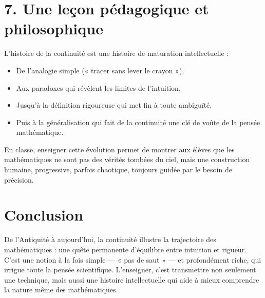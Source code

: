 \documentclass[12pt, a4paper]{article}
\begin{document}
\section*{7. Une leçon pédagogique et philosophique}
L’histoire de la continuité est une histoire de maturation intellectuelle :
\begin{itemize}
    \item De l’analogie simple (« tracer sans lever le crayon »),
    \item Aux paradoxes qui révèlent les limites de l’intuition,
    \item Jusqu’à la définition rigoureuse qui met fin à toute ambiguïté,
    \item Puis à la généralisation qui fait de la continuité une clé de voûte de la pensée mathématique.
\end{itemize}
En classe, enseigner cette évolution permet de montrer aux élèves que les mathématiques ne sont pas des vérités tombées du ciel, mais une construction humaine, progressive, parfois chaotique, toujours guidée par le besoin de précision.

\section*{Conclusion}
De l’Antiquité à aujourd’hui, la continuité illustre la trajectoire des mathématiques : une quête permanente d’équilibre entre intuition et rigueur. C’est une notion à la fois simple — « pas de saut » — et profondément riche, qui irrigue toute la pensée scientifique. L’enseigner, c’est transmettre non seulement une technique, mais aussi une histoire intellectuelle qui aide à mieux comprendre la nature même des mathématiques.
\end{document}
